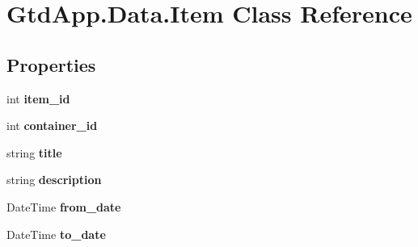 \hypertarget{class_gtd_app_1_1_data_1_1_item}{}\section{Gtd\+App.\+Data.\+Item Class Reference}
\label{class_gtd_app_1_1_data_1_1_item}
\subsection*{Properties}
\begin{DoxyCompactItemize}
\item 
\mbox{\label{class_gtd_app_1_1_data_1_1_item_acd5515b694950e686485d0648a22592d}} 
int {\bfseries item\+\_\+id}
\item 
\mbox{\label{class_gtd_app_1_1_data_1_1_item_a7ff748d295806fe1c1a148bddb2f7ec8}} 
int {\bfseries container\+\_\+id}
\item 
\mbox{\label{class_gtd_app_1_1_data_1_1_item_a593cd1ce2422e5081179168109332035}} 
string {\bfseries title}
\item 
\mbox{\label{class_gtd_app_1_1_data_1_1_item_a849f5a83d171e7b809ff352f42af497f}} 
string {\bfseries description}
\item 
\mbox{\label{class_gtd_app_1_1_data_1_1_item_a2a70a3b497476ced1b973b82f1de2c54}} 
Date\+Time {\bfseries from\+\_\+date}
\item 
\mbox{\label{class_gtd_app_1_1_data_1_1_item_a318faa76c3a08dfcd77cbcd0a1f363a6}} 
Date\+Time {\bfseries to\+\_\+date}
\item 

\end{DoxyCompactItemize}
